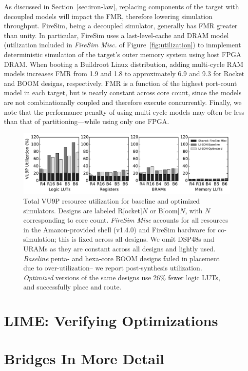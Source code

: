 As discussed in Section~\ref{sec:iron-law}, replacing components of the target with
decoupled models will impact the FMR, therefore lowering simulation throughput. 
FireSim, being a decoupled simulator, generally has FMR greater than unity. In
particular, FireSim uses a last-level-cache and DRAM model~\cite{fased} (utilization included in \emph{FireSim Misc.} of Figure~\ref{fig:utilization}) to
inmplement deterministic simulation of the target's outer memory system using host FPGA DRAM.
When booting a Buildroot Linux distribution, adding multi-cycle RAM models increases FMR
from 1.9 and 1.8 to approximately 6.9 and 9.3 for Rocket and BOOM designs, respectively.
FMR is a function of the highest port-count model in each target,
but is nearly constant across core count, since the models are not
combinationally coupled and therefore execute concurrently.
Finally, we note that the performance penalty of using multi-cycle models may
often be less than that of partitioning---while
using only one FPGA.

\begin{figure}[ht]
\centering
    \includegraphics[width=\textwidth]{figures/resource-utilization-vu9p.pdf}
    \vspace{-0.30in}
    \caption{Total VU9P resource utilization for baseline and optimized simulators. Designs are labeled R[ocket]$N$ or B[oom]$N$, with $N$
    corresponding to core count. \emph{FireSim Misc} accounts for all resources in
    the Amazon-provided shell (v1.4.0) and FireSim hardware for co-simulation; this is fixed across all designs.  We omit DSP48s and URAMs as they are constant across all designs and lightly used. \emph{Baseline} penta- and
    hexa-core BOOM designs failed in placement due to over-utilization--
    we report post-synthesis utilization. \emph{Optimized} versions of the same designs use 26\% fewer logic LUTs, and successfully place and route.}
    \label{fig:iccad19-utilization}
\end{figure}

\section{LIME: Verifying Optimizations}

\section{Bridges In More Detail}
%
%
%
%
%
